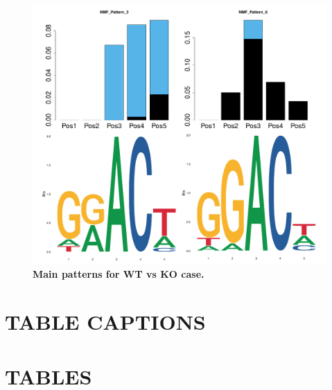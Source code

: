 \documentclass[times, 11pt, a4paper]{article}
\begin{document}
\begin{figure}[h!]
	\includegraphics[width = 1\textwidth]{img/pattern_WT_KO.pdf}
	\caption{\textbf{Main patterns for WT  vs KO case.} }
	\label{fig:pattern_WT.KO}
\end{figure}
\newpage

\section*{TABLE CAPTIONS}
\section*{TABLES}
\end{document}
